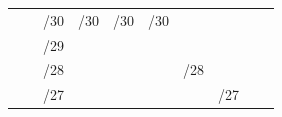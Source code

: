 \documentclass[11pt,a4paper]{report}
\begin{document}
\begin{center}
\begin{longtable}{rlcccccccccccccccc}
                                                                                                                         & \multicolumn{1}{l|}{} & \multicolumn{2}{l}{\cellcolor[HTML]{C09FE5}/30}       & \multicolumn{2}{c}{\cellcolor[HTML]{C09FE5}/30}       & \multicolumn{2}{c}{\cellcolor[HTML]{C09FE5}/30}        & \multicolumn{2}{c}{\cellcolor[HTML]{C09FE5}/30}         & \multicolumn{2}{c}{\cellcolor[HTML]{BFBFBF}}                      & \multicolumn{2}{c}{\cellcolor[HTML]{FFD966}}                      & \multicolumn{2}{c}{\cellcolor[HTML]{A9D08E}}                      & \multicolumn{2}{c|}{\cellcolor[HTML]{F4B084}}                      \\
                                                                                                                         & \multicolumn{1}{l|}{} & \multicolumn{4}{l}{/29}                                                                                       & \multicolumn{4}{c}{}                                                                                             & \multicolumn{2}{c}{\cellcolor[HTML]{BFBFBF}}                      & \multicolumn{2}{c}{\cellcolor[HTML]{FFD966}}                      & \multicolumn{2}{c}{\cellcolor[HTML]{A9D08E}}                      & \multicolumn{2}{c|}{\cellcolor[HTML]{F4B084}}                      \\
                                                                                                                         & \multicolumn{1}{l|}{} & \multicolumn{8}{l}{\cellcolor[HTML]{BFBFBF}/28}                                                                                                                                                                                  & \multicolumn{2}{c}{\multirow{-3}{*}{\cellcolor[HTML]{BFBFBF}/28}} & \multicolumn{2}{c}{\cellcolor[HTML]{FFD966}}                      & \multicolumn{2}{c}{\cellcolor[HTML]{A9D08E}}                      & \multicolumn{2}{c|}{\cellcolor[HTML]{F4B084}}                      \\
                                                                                                                         & \multicolumn{1}{l|}{} & \multicolumn{10}{l}{\cellcolor[HTML]{FFD966}/27}                                                                                                                                                                                                                                                     & \multicolumn{2}{c}{\multirow{-4}{*}{\cellcolor[HTML]{FFD966}/27}} & \multicolumn{2}{c}{\cellcolor[HTML]{A9D08E}}                      & \multicolumn{2}{c|}{\cellcolor[HTML]{F4B084}}                      \\

\end{longtable}
\end{center}
\end{document}
